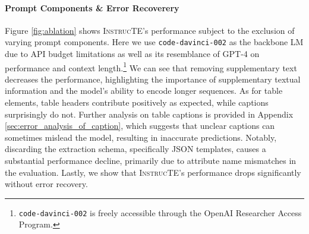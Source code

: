 \documentclass[11pt]{article}
\newcommand\method{\textsc{InstrucTE}}
\begin{document}
\paragraph{Prompt Components \& Error Recoverery}
Figure \ref{fig:ablation} shows \method{}'s performance subject to the exclusion of varying prompt components. Here we use \texttt{code-davinci-002} as the backbone LM due to API budget limitations as well as its resemblance of GPT-4 on performance and context length.\footnote{\texttt{code-davinci-002} is freely accessible through the OpenAI Researcher Access Program.}
We can see that removing supplementary text decreases the performance, highlighting the importance of supplementary textual information and the model's ability to encode longer sequences.  As for table elements, table headers contribute positively as expected, while captions surprisingly do not. Further analysis on table captions is provided in Appendix \ref{sec:error_analysis_of_caption}, which suggests that unclear captions can sometimes mislead the model, resulting in inaccurate predictions.
Notably, discarding the extraction schema, specifically JSON templates, causes a substantial performance decline, primarily due to attribute name mismatches in the evaluation.
Lastly, we show that \method{}'s performance drops significantly without error recovery. 
\end{document}
